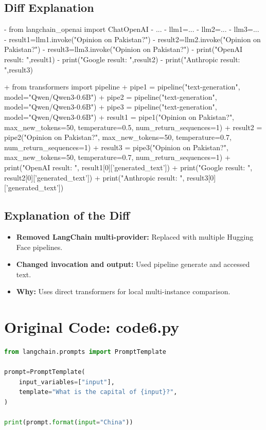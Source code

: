 \documentclass[11pt, a4paper]{article}
\begin{document}
\subsection{Diff Explanation}
\begin{removedcode}
\begin{diffverb}
- from langchain_openai import ChatOpenAI
- ...
- llm1=...
- llm2=...
- llm3=...
- result1=llm1.invoke("Opinion on Pakistan?")
- result2=llm2.invoke("Opinion on Pakistan?")
- result3=llm3.invoke("Opinion on Pakistan?")
- print("OpenAI result: ",result1)
- print("Google result: ",result2)
- print("Anthropic result: ",result3)
\end{diffverb}
\end{removedcode}

\begin{addedcode}
\begin{diffverb}
+ from transformers import pipeline
+ pipe1 = pipeline("text-generation", model="Qwen/Qwen3-0.6B")
+ pipe2 = pipeline("text-generation", model="Qwen/Qwen3-0.6B")
+ pipe3 = pipeline("text-generation", model="Qwen/Qwen3-0.6B")
+ result1 = pipe1("Opinion on Pakistan?", max_new_tokens=50, temperature=0.5, num_return_sequences=1)
+ result2 = pipe2("Opinion on Pakistan?", max_new_tokens=50, temperature=0.7, num_return_sequences=1)
+ result3 = pipe3("Opinion on Pakistan?", max_new_tokens=50, temperature=0.7, num_return_sequences=1)
+ print("OpenAI result: ", result1[0]['generated_text'])
+ print("Google result: ", result2[0]['generated_text'])
+ print("Anthropic result: ", result3[0]['generated_text'])
\end{diffverb}
\end{addedcode}


\subsection{Explanation of the Diff}
\begin{itemize}
    \item \textbf{Removed LangChain multi-provider:} Replaced with multiple Hugging Face pipelines.
    \item \textbf{Changed invocation and output:} Used pipeline generate and accessed text.
    \item \textbf{Why:} Uses direct transformers for local multi-instance comparison.
\end{itemize}


\newpage
\section{Original Code: code6.py}
\begin{lstlisting}[language=Python]
from langchain.prompts import PromptTemplate

prompt=PromptTemplate(
    input_variables=["input"],
    template="What is the capital of {input}?",
)

print(prompt.format(input="China"))
\end{lstlisting}
\end{document}

